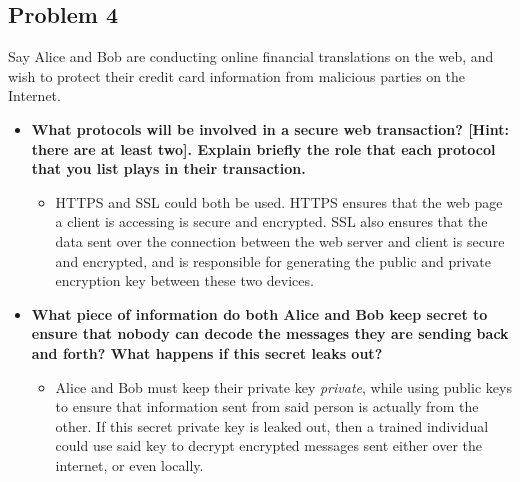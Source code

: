 \documentclass[11pt]{article}
\begin{document}
\subsection*{Problem 4}
Say Alice and Bob are conducting online financial translations on the web, and wish to protect their credit card information from malicious parties on the Internet. 

\begin{itemize}
	\item \textbf{What protocols will be involved in a secure web transaction? [Hint: there are at least two]. Explain briefly the role that each protocol that you list plays in their transaction.}
		\begin{itemize}
			\item HTTPS and SSL could both be used. HTTPS ensures that the web page a client is accessing is secure and encrypted. SSL also ensures that the data sent over the connection between the web server and client is secure and encrypted, and is responsible for generating the public and private encryption key between these two devices.
		\end{itemize}
	\item \textbf{What piece of information do both Alice and Bob keep secret to ensure that nobody can decode the messages they are sending back and forth? What happens if this secret leaks out?}
		\begin{itemize}
			\item Alice and Bob must keep their private key \emph{private}, while using public keys to ensure that information sent from said person is actually from the other. If this secret private key is leaked out, then a trained individual could use said key to decrypt encrypted messages sent either over the internet, or even locally. 
		\end{itemize}
\end{itemize}
\end{document}
